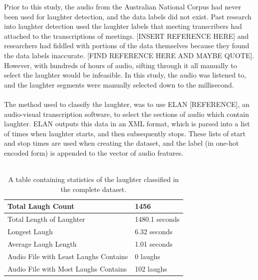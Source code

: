 \documentclass[a4paper,11pt,notitlepage]{article}
\begin{document}
Prior to this study, the audio from the Australian National Corpus had never been used for laughter detection, and the data labels did not exist. Past research into laughter detection used the laughter labels that meeting transcribers had attached to the transcriptions of meetings. [INSERT REFERENCE HERE] and researchers had fiddled with portions of the data themselves because they found the data labels inaccurate. [FIND REFERENCE HERE AND MAYBE QUOTE]. However, with hundreds of hours of audio, sifting through it all manually to select the laughter would be infeasible. In this study, the audio was listened to, and the laughter segments were manually selected down to the millisecond.\\
\\
The method used to classify the laughter, was to use ELAN [REFERENCE], an audio-visual transcription software, to select the sections of audio which contain laughter. ELAN outputs this data in an XML format, which is parsed into a list of times when laughter starts, and then subsequently stops. These lists of start and stop times are used when creating the dataset, and the label (in one-hot encoded form) is appended to the vector of audio features.\\
\\ 
\begin{table}[]
\centering
\begin{tabular}{|l|l|}
\hline
Total Laugh Count                     & 1456           \\ \hline
Total Length of Laughter              & 1480.1 seconds \\ \hline
Longest Laugh                         & 6.32 seconds   \\ \hline
Average Laugh Length                  & 1.01 seconds   \\ \hline
Audio File with Least Laughs Contains & 0 laughs       \\ \hline
Audio File with Most Laughs Contains  & 102 laughs     \\ \hline
\end{tabular}
\caption{A table containing statistics of the laughter classified in the complete dataset.}
\label{laughter_stats_table}
\end{table}
\end{document}
